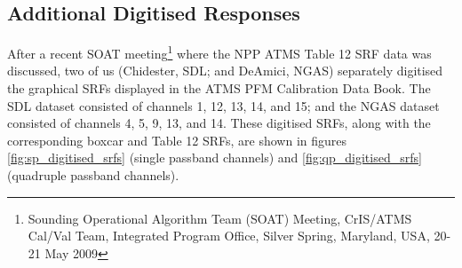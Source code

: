 \subsection{Additional Digitised Responses}
After a recent SOAT meeting\footnote{Sounding Operational Algorithm Team (SOAT) Meeting, CrIS/ATMS Cal/Val Team, Integrated Program Office, Silver Spring, Maryland, USA, 20-21 May 2009} where the NPP ATMS Table 12 SRF data was discussed, two of us (Chidester, SDL; and DeAmici, NGAS) separately digitised the graphical SRFs displayed in the ATMS PFM Calibration Data Book\cite{ATMS_PFM_CalLog}. The SDL dataset consisted of channels 1, 12, 13, 14, and 15; and the NGAS dataset consisted of channels 4, 5, 9, 13, and 14. These digitised SRFs, along with the corresponding boxcar and Table 12 SRFs, are shown in figures \ref{fig:sp_digitised_srfs} (single passband channels) and \ref{fig:qp_digitised_srfs} (quadruple passband channels).

